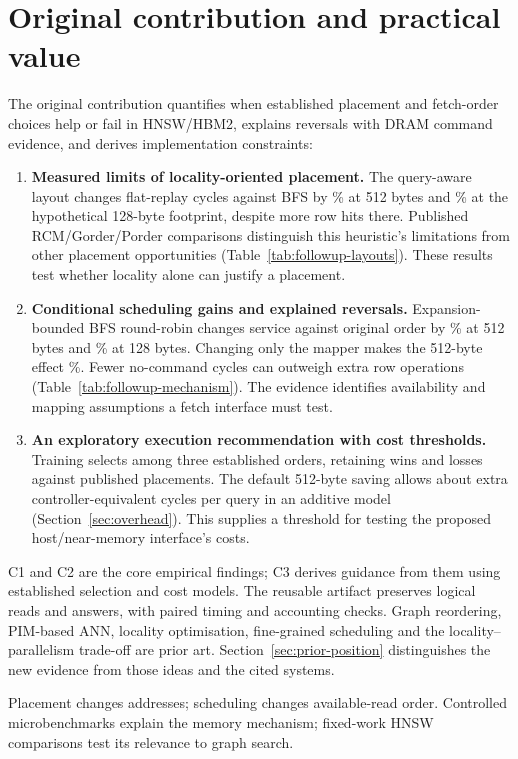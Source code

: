 \documentclass[11pt,a4paper]{report}
\begin{document}
\section{Original contribution and practical value}\label{sec:contribution}
The original contribution quantifies when established placement and fetch-order choices help or fail in HNSW/HBM2, explains reversals with DRAM command evidence, and derives implementation constraints:
\begin{enumerate}[label=C\arabic*.]
\item \textbf{Measured limits of locality-oriented placement.} The query-aware layout changes flat-replay cycles against BFS by \QADeltaFloat\% at 512 bytes and \QADeltaCompact\% at the hypothetical 128-byte footprint, despite more row hits there. Published RCM/Gorder/Porder comparisons distinguish this heuristic's limitations from other placement opportunities (Table~\ref{tab:followup-layouts}). These results test whether locality alone can justify a placement.
\item \textbf{Conditional scheduling gains and explained reversals.} Expansion-bounded BFS round-robin changes service against original order by \RoundRobinBFSMeanFloat\% at 512 bytes and \RoundRobinBFSMeanCompact\% at 128 bytes. Changing only the mapper makes the 512-byte effect \SchedAlternateMappingRRFloat\%. Fewer no-command cycles can outweigh extra row operations (Table~\ref{tab:followup-mechanism}). The evidence identifies availability and mapping assumptions a fetch interface must test.
\item \textbf{An exploratory execution recommendation with cost thresholds.} Training selects among three established orders, retaining wins and losses against published placements. The default 512-byte saving allows about \RoundRobinBFSSavedFloat{} extra controller-equivalent cycles per query in an additive model (Section~\ref{sec:overhead}). This supplies a threshold for testing the proposed host/near-memory interface's costs.
\end{enumerate}
C1 and C2 are the core empirical findings; C3 derives guidance from them using established selection and cost models. The reusable artifact preserves logical reads and answers, with paired timing and accounting checks. Graph reordering, PIM-based ANN, locality optimisation, fine-grained scheduling and the locality--parallelism trade-off are prior art. Section~\ref{sec:prior-position} distinguishes the new evidence from those ideas and the cited systems.

Placement changes addresses; scheduling changes available-read order. Controlled microbenchmarks explain the memory mechanism; fixed-work HNSW comparisons test its relevance to graph search.
\end{document}
